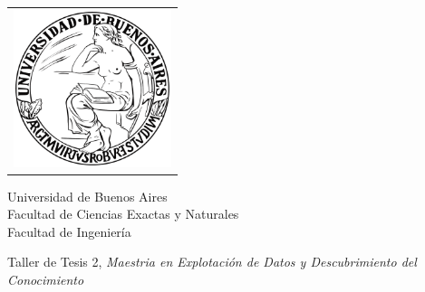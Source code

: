 \newcommand{\HRule}{\rule{\linewidth}{0.2mm}}
%
\thispagestyle{empty}

\begin{center}\leavevmode

\vspace{-2cm}

\begin{tabular}{l}
\includegraphics[width=4.6cm]{./images/logouba.png}
\end{tabular}


{\large \sc Universidad de Buenos Aires\\Facultad de Ciencias Exactas y Naturales \\ Facultad de Ingeniería}

\vspace{5.0cm}

\begin{huge}
\textbf{\tituloTesis}
\end{huge}

\vspace{2cm}

{\large Taller de Tesis 2, \textit{Maestria en Explotación de Datos y Descubrimiento del Conocimiento}}
\vspace{2cm}

\vspace{2cm}

{\Large \autor}

\end{center}

\vfill

{\large


\vspace{.2cm}


\vspace{.2cm}

\lugar
}

\newpage\thispagestyle{empty}

